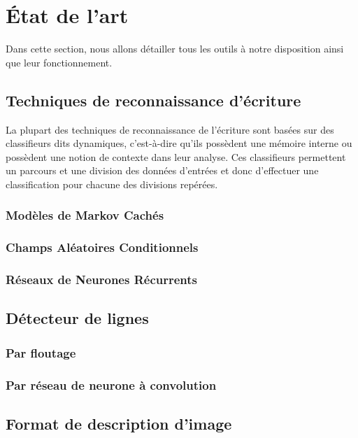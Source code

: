 \chapter{État de l'art}

Dans cette section, nous allons détailler tous les outils à notre disposition ainsi que leur fonctionnement.

\section{Techniques de reconnaissance d’écriture}

La plupart des techniques de reconnaissance de l’écriture sont basées sur des classifieurs
dits dynamiques, c’est-à-dire qu’ils possèdent une mémoire interne ou possèdent une notion
de contexte dans leur analyse. Ces classifieurs permettent un parcours et une division des
données d’entrées et donc d’effectuer une classification pour chacune des divisions repérées. 
		
\subsection{Modèles de Markov Cachés}

\subsection{Champs Aléatoires Conditionnels}

\subsection{Réseaux de Neurones Récurrents}

\section{Détecteur de lignes}

\subsection{Par floutage}

\subsection{Par réseau de neurone à convolution}

\section{Format de description d’image}

